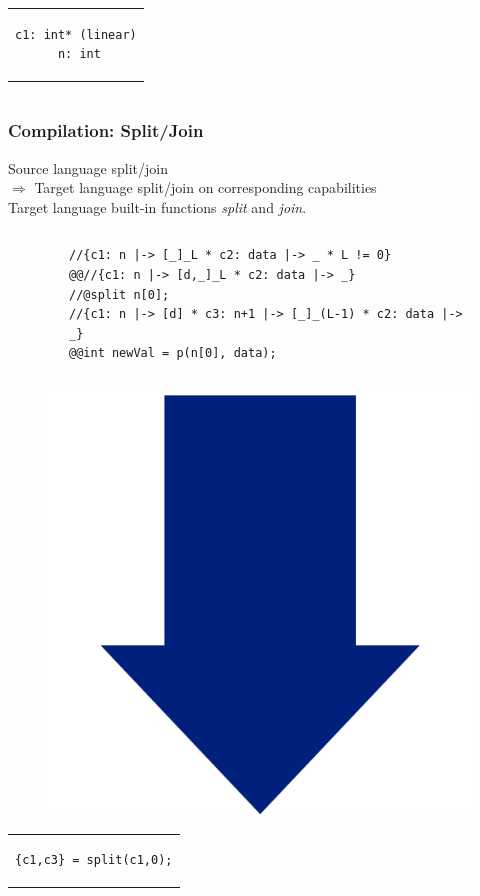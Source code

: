\documentclass{beamer}
\begin{document}
\begin{frame}[fragile]
\begin{columns}
\begin{column}{0.4\textwidth}
\begin{center}
\begin{tabular}{c}
\begin{lstlisting}[style=CStyleNoNum, captionpos = t]
c1: int* (linear)
 n: int
\end{lstlisting}
\end{tabular}
\end{center}

\end{column}
\end{columns}

\end{frame}

\begin{frame}[fragile]
\frametitle{Compilation: Split/Join}
Source language split/join\\
$\Rightarrow$ Target language split/join on corresponding capabilities\\
Target language built-in functions \emph{split} and \emph{join}.\\
\vspace{-1em}

\begin{columns}
\begin{column}{0.15\textwidth}
\end{column}
\begin{column}{0.90\textwidth}
\begin{figure}[h]
  \centering
\begin{lstlisting}[style=CStyleOverlay, captionpos = t, firstnumber = 9]
//{c1: n |-> [_]_L * c2: data |-> _ * L != 0}
@@//{c1: n |-> [d,_]_L * c2: data |-> _}
//@split n[0];
//{c1: n |-> [d] * c3: n+1 |-> [_]_(L-1) * c2: data |-> _}
@@int newVal = p(n[0], data);
\end{lstlisting}
\end{figure}
\end{column}
\end{columns}

\vspace{-.5em}
\begin{figure}[h]
\includegraphics[width=0.07\linewidth]{BlueArrowVertical}
\end{figure}
\vspace{-2em}

\begin{center}
\begin{tabular}{c}
\begin{lstlisting}[style=CStyleNoNum, captionpos = t]
{c1,c3} = split(c1,0);
\end{lstlisting}
\end{tabular}
\end{center}
\end{frame}
\end{document}
